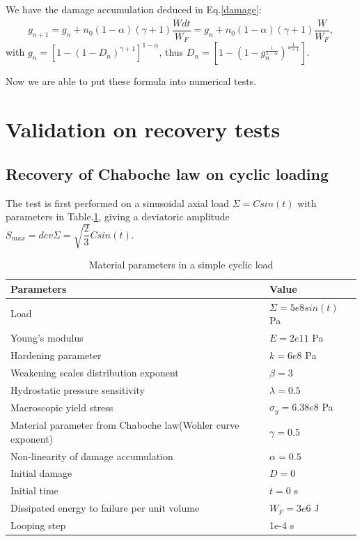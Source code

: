 \documentclass[3p,times,number,review]{elsarticle}
\begin{document}
We have the damage accumulation deduced in Eq.\eqref{damage}:
$$g_{n+1}=g_n+n_0(1-\alpha)(\gamma+1)\dfrac{\dot{W}dt}{W_F}=g_n+n_0(1-\alpha)(\gamma+1)\dfrac{W}{W_F},$$
with $g_n=\left[ 1-\left( 1-D_{n}\right)^{\gamma+1} \right]^{1-\alpha}$, thus $D_n=\left[1-\left(1-g_n^{\frac{1}{1-\alpha}} \right)^{\frac{1}{\gamma+1}}  \right]$.
 
 Now we are able to put these formula into numerical tests.
 
\section{Validation on recovery tests}
\subsection{Recovery of Chaboche law on cyclic loading}
The test is first performed on a sinusoidal axial load $\Sigma=Csin(t)$ with parameters in Table.\ref{Sin}, giving a deviatoric amplitude $S_{max}=dev\Sigma=\sqrt{\dfrac{2}{3}}Csin(t)$.
\begin{table}[!h]
	\centering
	\begin{tabular}{ll}
		\hline
		\textbf{Parameters}                                         & \textbf{Value}                    \\ \hline
		Load                                                              & $\Sigma=5e8sin(t)$ Pa                  \\
		Young's modulus                                             & $E=2e11$ Pa                       \\
		Hardening parameter                                         &  $k=6e8$ Pa \\
		Weakening scales distribution exponent                      & $\beta=3$                             \\
		Hydrostatic pressure sensitivity                            & $\lambda=0.5$                     \\
		Macroscopic yield stress                                    & $\sigma_y=6.38e8$ Pa              \\
		Material parameter from Chaboche law(Wohler curve exponent) & $\gamma=0.5$                        \\
		Non-linearity of damage accumulation & $\alpha=0.5$                        \\
		Initial damage                                              & $D=0$                          \\
		Initial time                                                & $t=0$ s                            \\
		Dissipated energy to failure per unit volume                & $W_F=3e6$ J                       \\
		Looping step                                           & 1e-4 s              \\ \hline
	\end{tabular}
		\caption{Material parameters in a simple cyclic load }
		\label{Sin}
\end{table}
\end{document}
